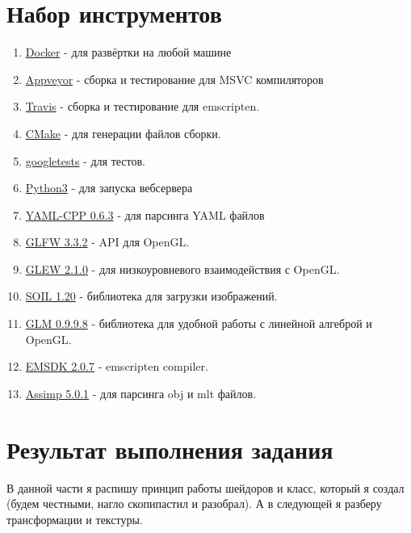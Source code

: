 \documentclass[12pt]{article}
\begin{document}
    \section{Набор инструментов}
    \begin{enumerate}
        \item \href{https://www.docker.com/}{Docker} - для развёртки на любой машине
        \item \href{https://ci.appveyor.com/project/JuiceFV/emscripten-opengl/}{Appveyor} - сборка и тестирование для MSVC компиляторов
        \item \href{https://travis-ci.org/github/JuiceFV/Emscripten_OpenGL}{Travis} - сборка и тестирование для emscripten.
        \item \href{https://cmake.org/}{CMake} - для генерации файлов сборки.
        \item \href{https://github.com/google/googletest}{googletests} - для тестов.
        \item \href{https://www.python.org/}{Python3} - для запуска вебсервера
        \item \href{https://github.com/jbeder/yaml-cpp}{YAML-CPP 0.6.3} - для парсинга YAML файлов
        \item \href{https://github.com/glfw/glfw/releases/tag/3.3.2}{GLFW 3.3.2} - API для OpenGL.
        \item \href{https://github.com/nigels-com/glew/releases/tag/glew-2.1.0}{GLEW 2.1.0} - для низкоуровневого взаимодействия с OpenGL.
        \item \href{https://github.com/SpartanJ/SOIL2/releases/tag/release-1.20}{SOIL 1.20} - библиотека для загрузки изображений.
        \item \href{https://github.com/g-truc/glm/releases/tag/0.9.9.8}{GLM 0.9.9.8} - библиотека для удобной работы с линейной алгеброй и OpenGL.
        \item \href{https://github.com/emscripten-core/emsdk/releases/tag/2.0.7}{EMSDK 2.0.7} - emscripten compiler.
        \item \href{https://github.com/assimp/assimp/releases/tag/v5.0.1}{Assimp 5.0.1} - для парсинга obj и mlt файлов.
    \end{enumerate}
    \section{Результат выполнения задания}
    В данной части я распишу принцип работы шейдоров и класс, который я создал
    (будем честными, нагло скопипастил и разобрал). А в следующей я разберу 
    трансформации и текстуры.
\end{document}
